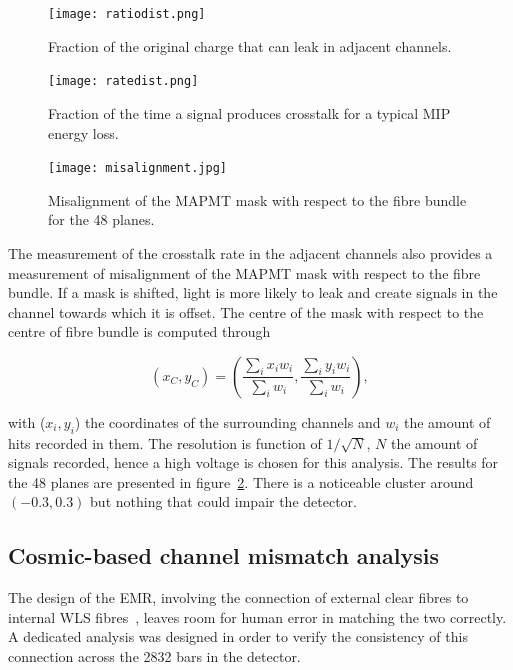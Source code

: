 \documentclass[a4paper,11pt]{article}
\begin{document}
\begin{figure}[htr!]
  \begin{minipage}[b]{.45\textwidth}
   \centering
   \texttt{[image: ratiodist.png]}
   \caption{Fraction of the original charge that can leak in adjacent channels.}
   \label{fig:ratio_dist}
  \end{minipage}
  \hspace{3mm}
  \begin{minipage}[b]{.45\textwidth}
   \centering
   \texttt{[image: ratedist.png]}
   \caption{Fraction of the time a signal produces crosstalk for a typical MIP energy loss.}
   \label{fig:rate_dist}
  \end{minipage}
\end{figure}

\begin{figure}[htr!]
   \centering
   \texttt{[image: misalignment.jpg]}
   \caption{Misalignment of the MAPMT mask with respect to the fibre bundle for the 48 planes.}
   \label{fig:misalignment}
\end{figure}

The measurement of the crosstalk rate in the adjacent channels also provides a measurement of misalignment of the MAPMT mask with respect to the fibre bundle.
If a mask is shifted, light is more likely to leak and create signals in the channel towards which it is offset. The centre of the mask with respect to the
centre of fibre bundle is computed through

\begin{equation}
(x_C,y_C)=\left(\frac{\sum_ix_iw_i}{\sum_iw_i},\frac{\sum_iy_iw_i}{\sum_iw_i}\right),
\end{equation}

with ($x_i,y_i$) the coordinates of the surrounding channels and $w_i$ the amount of hits recorded in them. The resolution is function of $1/\sqrt{N}$, $N$
the amount of signals recorded, hence a high voltage is chosen for this analysis. The results for the 48 planes are presented in figure~\ref{fig:misalignment}.
There is a noticeable cluster around $(-0.3,0.3)$ but nothing that could impair the detector.

\subsection{Cosmic-based channel mismatch analysis}\label{sec:ch_mismatch}

The design of the EMR, involving the connection of external clear fibres to internal WLS fibres~\cite{emr_design_change}, leaves room for human error in
matching the two correctly. A dedicated analysis was designed in order to verify the consistency of this connection across the 2832 bars in the detector. 
\end{document}
